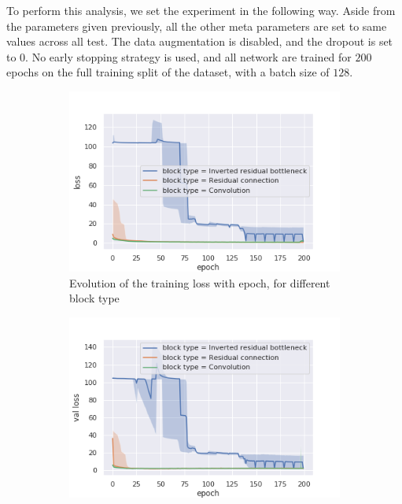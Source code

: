 To perform this analysis, we set the experiment in the following way. Aside from the parameters given previously, all the other meta parameters are set to same values across all test. The data augmentation is disabled, and the dropout is set to $0$. No early stopping strategy is used, and all network are trained for $200$ epochs on the full training split of the dataset, with a batch size of $128$.

\begin{figure}
  \begin{center}
    \begin{subfigure}[t]{.49\linewidth}
      \centering
      \includegraphics[width=0.99\linewidth]{figures/all_epoch_loss_block_type.png}
      \caption{Evolution of the training loss with epoch, for different block type}
      \label{fig:overfitloss}
    \end{subfigure}
    \begin{subfigure}[t]{.49\linewidth}
      \centering
      \includegraphics[width=0.99\linewidth]{figures/all_epoch_val_loss_block_type.png}

\end{subfigure}
\end{center}
\end{figure}
